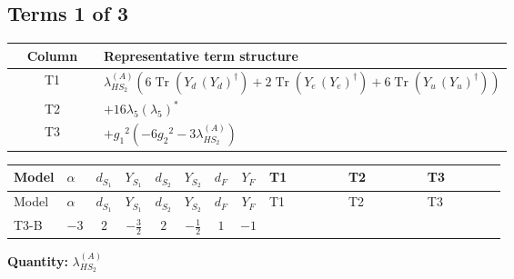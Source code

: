 \documentclass[8pt]{article}
\begin{document}
\begin{landscape}
\subsection*{Terms 1 of 3}
\begin{center}
\begin{tabular}{@{}c >{\raggedright\arraybackslash}p{0.82\linewidth}@{}}
\toprule
Column & Representative term structure \\
\midrule
T1 & \(\displaystyle {\lambda_{HS_2}^{(A)}} (6 \operatorname{Tr}\!\left({Y_d}\,\left({Y_d}\right)^{\dagger}\right)+2 \operatorname{Tr}\!\left({Y_e}\,\left({Y_e}\right)^{\dagger}\right)+6 \operatorname{Tr}\!\left({Y_u}\,\left({Y_u}\right)^{\dagger}\right))\) \\
\midrule
T2 & \(\displaystyle +16 {\lambda_5} \left({\lambda_5}\right)^{*}\) \\
\midrule
T3 & \(\displaystyle +{g_1}^2 \left(-6 {g_2}^2-3 {\lambda_{HS_2}^{(A)}}\right)\) \\
\midrule
\bottomrule
\end{tabular}
\end{center}
\smallskip
\tiny
\begin{longtable}{@{}llcccccc >{\raggedright\arraybackslash}p{0.21\linewidth} >{\raggedright\arraybackslash}p{0.21\linewidth} >{\raggedright\arraybackslash}p{0.21\linewidth}@{}}
\toprule
Model & $\alpha$ & $d_{S_1}$ & $Y_{S_1}$ & $d_{S_2}$ & $Y_{S_2}$ & $d_F$ & $Y_F$ & T1 & T2 & T3 \\
\midrule
\endfirsthead
\toprule
Model & $\alpha$ & $d_{S_1}$ & $Y_{S_1}$ & $d_{S_2}$ & $Y_{S_2}$ & $d_F$ & $Y_F$ & T1 & T2 & T3 \\
\midrule
\endhead
T3-B & $-3$ & $2$ & $-\frac{3}{2}$ & $2$ & $-\frac{1}{2}$ & $1$ & $-1$ & \scriptsize\adjustbox{max width=\linewidth}{$\begin{gathered} {\lambda_{HS_2}^{(A)}} (6 \operatorname{Tr}\!\left({Y_d}\,\left({Y_d}\right)^{\dagger}\right)+2 \operatorname{Tr}\!\left({Y_e}\,\left({Y_e}\right)^{\dagger}\right)+6 \operatorname{Tr}\!\left({Y_u}\,\left({Y_u}\right)^{\dagger}\right))\end{gathered}$} & \scriptsize\adjustbox{max width=\linewidth}{$\begin{gathered} +16 {\lambda_5} \left({\lambda_5}\right)^{*}\end{gathered}$} & \scriptsize\adjustbox{max width=\linewidth}{$\begin{gathered} +{g_1}^2 \left(-6 {g_2}^2-3 {\lambda_{HS_2}^{(A)}}\right)\end{gathered}$} \\
\midrule
\bottomrule
\end{longtable}
\clearpage
\noindent\textbf{Quantity: }$\lambda_{HS_2}^{(A)}$\par\smallskip

\end{landscape}
\end{document}
